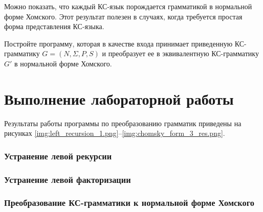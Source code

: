 Можно показать, что каждый КС-язык порождается грамматикой в нормальной форме Хомского. Этот результат полезен в случаях, когда требуется простая форма представления КС-языка.

Постройте программу, которая в качестве входа принимает приведенную КС-грамматику $G = (N, \Sigma, P, S)$ и преобразует ее в эквивалентную КС-грамматику $G'$ в нормальной форме Хомского.


\chapter{Выполнение лабораторной работы}

Результаты работы программы по преобразованию грамматик приведены на рисунках \ref{img:left_recursion_1.png}--\ref{img:chomsky_form_3_res.png}.

\subsection{Устранение левой рекурсии}





\clearpage



\subsection{Устранение левой факторизации}



\clearpage

\subsection{Преобразование КС-грамматики к нормальной форме Хомского}

